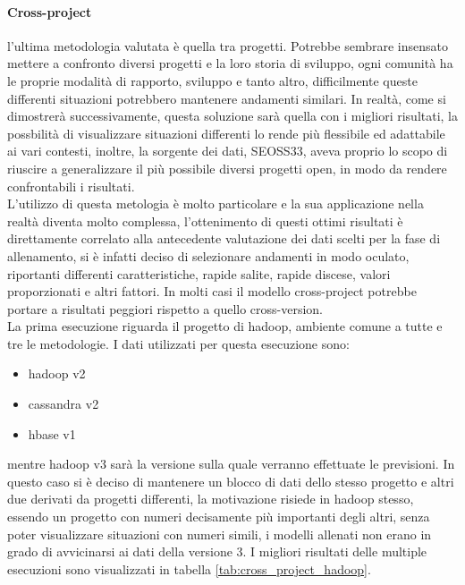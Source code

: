 \documentclass[%
    corpo=12pt,
    twoside,
    oldstyle,
    autoretitolo,
    greek,
    evenboxes,
]{toptesi}
\begin{document}
\paragraph{Cross-project} l'ultima metodologia valutata è quella tra progetti. Potrebbe sembrare insensato mettere a confronto diversi progetti e la loro storia di sviluppo, ogni comunità ha le proprie modalità di rapporto, sviluppo e tanto altro, difficilmente queste differenti situazioni potrebbero mantenere andamenti similari. In realtà, come si dimostrerà successivamente, questa soluzione sarà quella con i migliori risultati, la possbilità di visualizzare situazioni differenti lo rende più flessibile ed adattabile ai vari contesti, inoltre, la sorgente dei dati, SEOSS33, aveva proprio lo scopo di riuscire a generalizzare il più possibile diversi progetti open, in modo da rendere confrontabili i risultati.\\
L'utilizzo di questa metologia è molto particolare e la sua applicazione nella realtà diventa molto complessa, l'ottenimento di questi ottimi risultati è direttamente correlato alla antecedente valutazione dei dati scelti per la fase di allenamento, si è infatti deciso di selezionare andamenti in modo oculato, riportanti differenti caratteristiche, rapide salite, rapide discese, valori proporzionati e altri fattori. In molti casi il modello cross-project potrebbe portare a risultati peggiori rispetto a quello cross-version.\\
La prima esecuzione riguarda il progetto di hadoop, ambiente comune a tutte e tre le metodologie. I dati utilizzati per questa esecuzione sono:
\begin{itemize}
  \item hadoop v2
  \item cassandra v2
  \item hbase v1
\end{itemize}
mentre hadoop v3 sarà la versione sulla quale verranno effettuate le previsioni. In questo caso si è deciso di mantenere un blocco di dati dello stesso progetto e altri due derivati da progetti differenti, la motivazione risiede in hadoop stesso, essendo un progetto con numeri decisamente più importanti degli altri, senza poter visualizzare situazioni con numeri simili, i modelli allenati non erano in grado di avvicinarsi ai dati della versione 3. I migliori risultati delle multiple esecuzioni sono visualizzati in tabella \ref{tab:cross_project_hadoop}.
\end{document}
